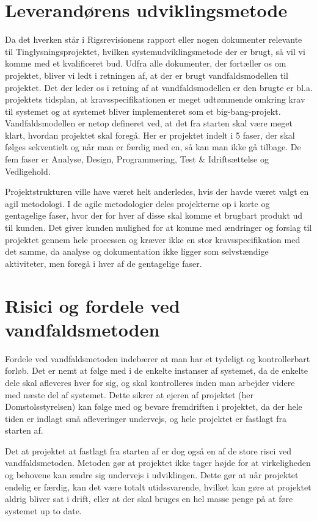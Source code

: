 \documentclass[10pt,a4paper,danish]{article}
\begin{document}
\section{Leverandørens udviklingsmetode}
Da det hverken står i Rigsrevisionens rapport\cite{Rigs} eller nogen dokumenter relevante til Tinglysningsprojektet, hvilken systemudviklingsmetode der er brugt, så vil vi komme med et kvalificeret bud.
Udfra alle dokumenter, der fortæller os om projektet, bliver vi ledt i retningen af, at der er brugt vandfaldsmodellen til projektet.
Det der leder os i retning af at vandfaldsmodellen er den brugte er bl.a. projektets tidsplan, at kravsspecifikationen er meget udtømmende omkring krav til systemet og at systemet bliver implementeret som et big-bang-projekt.
Vandfaldsmodellen er netop defineret ved, at det fra starten skal være meget klart, hvordan projektet skal foregå.
Her er projektet indelt i 5 faser, der skal følges sekventielt og når man er færdig med en, så kan man ikke gå tilbage.
De fem faser er Analyse, Design, Programmering, Test \& Idriftsættelse og Vedligehold.

Projektstrukturen ville have været helt anderledes, hvis der havde været valgt en agil metodologi.
I de agile metodologier deles projekterne op i korte og gentagelige faser, hvor der for hver af disse skal komme et brugbart produkt ud til kunden.
Det giver kunden mulighed for at komme med ændringer og forslag til projektet gennem hele processen og kræver ikke
en stor kravsspecifikation med det samme, da analyse og dokumentation ikke ligger som selvstændige aktiviteter, men
foregå i hver af de gentagelige faser.

\section{Risici og fordele ved vandfaldsmetoden}
Fordele ved vandfaldsmetoden indebærer at man har et tydeligt og kontrollerbart forløb. Det er nemt at følge med i de enkelte instanser af systemet, da de enkelte dele skal afleveres hver for sig, og skal kontrolleres inden man arbejder videre med næste del af systemet. Dette sikrer at ejeren af projektet (her Domstolsstyrelsen) kan følge med og bevare fremdriften i projektet, da der hele tiden er indlagt små afleveringer undervejs, og hele projektet er fastlagt fra starten af. 

Det at projektet at fastlagt fra starten af er dog også en af de store risci ved vandfaldsmetoden. Metoden gør at projektet ikke tager højde for at virkeligheden og behovene kan ændre sig undervejs i udviklingen. Dette gør at når projektet endelig er færdig, kan det være totalt utidssvarende, hvilket kan gøre at projektet aldrig bliver sat i drift, eller at der skal bruges en hel masse penge på at føre systemet up to date.
\end{document}
